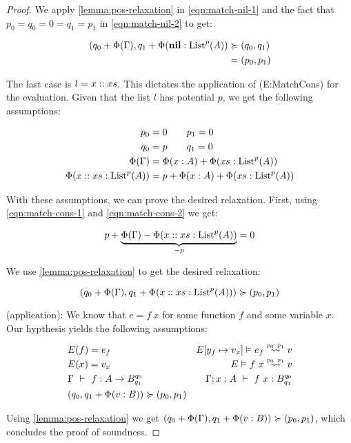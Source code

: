 \begin{proof}
   We apply \cref{lemma:pos-relaxation} in \cref{eqn:match-nil-1} and the fact that \(p_0 = q_0 = 0 = q_1 = p_1\) in \cref{eqn:match-nil-2} to get: 
   
   \begin{align}
      (q_0 + \Phi(\Gamma), q_1 + \Phi(\listnil : \ralist{p}{A})   &\relaxation (q_0, q_1) \label{eqn:match-nil-1}\\
                                                                  &= (p_0, p_1) \label{eqn:match-nil-2}
   \end{align}

   The last case is \(l = x :: xs\). This dictates the application of (E:MatchCons) for the evaluation. Given that the list \(l\) has potential \(p\), we get the following assumptions:

   \begin{align}
      p_0            &= 0 \qquad p_1 = 0\nonumber\\
      q_0            &= p \qquad q_1 = 0\nonumber\\
      \Phi(\Gamma)   &= \Phi(x : A) + \Phi(xs : \ralist{p}{A})\label{eqn:match-cons-1}\\
      \Phi(\cons{x}{xs} : \ralist{p}{A}) &= p + \Phi(x : A) + \Phi(xs : \ralist{p}{A})\label{eqn:match-cons-2}
   \end{align}

   With these assumptions, we can prove the desired relaxation. First, using \cref{eqn:match-cons-1} and \cref{eqn:match-cons-2} we get:

   \begin{align}
      p + \underbrace{\Phi(\Gamma) - \Phi(x :: xs : \text{List}^{p}(A))}_{-p} = 0
   \end{align}

   We use \cref{lemma:pos-relaxation} to get the desired relaxation:

   \[
      (q_0 + \Phi(\Gamma), q_1 + \Phi(x :: xs : \text{List}^{p}(A))) \succcurlyeq (p_0, p_1)
   \]

   (application): We know that \(e = f~x\) for some function \(f\) and some variable \(x\). Our hypthesis yields the following assumptions:

   \begin{align}
      &E(f) = e_f                                      &\evals{\envaugment{E}{y_f}{v_x}}{e_f}{v}{p_0}{p_1} \nonumber\\
      &E(x) = v_x                                      &\evals{E}{f~x}{v}{p_0}{p_1} \nonumber\\
      &\typing{\Gamma}{f}{A \to \ratype{B}{q_0}{q_1}}  &\typing{\Gamma;x : A}{f~x}{\ratype{B}{q_0}{q_1}} \nonumber \\
      &(q_0, q_1 + \Phi(v : B)) \relaxation (p_0, p_1)
   \end{align}

   Using \cref{lemma:pos-relaxation} we get \((q_0 + \Phi(\Gamma), q_1 + \Phi(v : B)) \succcurlyeq (p_0, p_1)\), which concludes the proof of soundness.


\end{proof}
 
